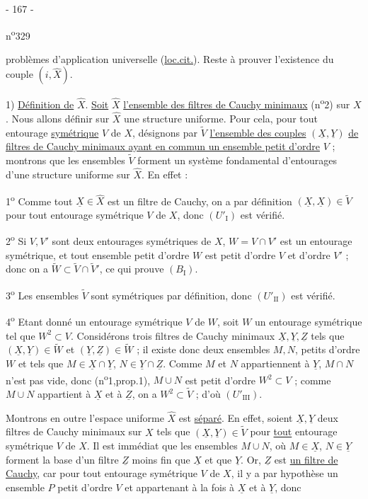 \begin{center}- 167 -\end{center}
\hfill n\textsuperscript{o}329

problèmes d'application universelle (\uline{loc.cit.}). Reste à prouver l'existence
du couple $(i,\widehat{X})$.

1) \uline{Définition de} $\widehat{X}$. \uline{Soit} $\widehat{X}$
\uline{l'ensemble des filtres de Cauchy minimaux} (n\textsuperscript{o}2)
sur $X$. Nous allons définir sur $\widehat{X}$ une structure uniforme.
Pour cela, pour tout entourage \uline{symétrique} $V$ de $X$, désignons par
$\widetilde{V}$ \uline{l'ensemble des couples}
$(\underline{X},\underline{Y})$ \uline{de filtres de Cauchy minimaux ayant en commun
un ensemble petit d'ordre} $V$ ; montrons que les ensembles $\widetilde{V}$
forment un système fondamental d'entourages d'une structure uniforme sur
$\widehat{X}$. En effet :

1\textsuperscript{o} Comme tout $\underline{X}\in\widehat{X}$ est un filtre de
Cauchy, on a par définition $(\underline{X},\underline{X})\in\widetilde{V}$
pour tout entourage symétrique $V$ de $X$, donc $(U'_{\mathrm{I}})$ est vérifié.

2\textsuperscript{o} Si $V,V'$ sont deux entourages symétriques de $X$,
$W=V\cap V'$ est un entourage symétrique, et tout ensemble petit d'ordre $W$
est petit d'ordre $V$ et d'ordre $V'$ ; donc on a
$\widetilde{W}\subset\widetilde{V}\cap\widetilde{V}'$, ce qui prouve $(B_{\mathrm{I}})$.

3\textsuperscript{o} Les ensembles $\widetilde{V}$ sont symétriques par définition,
donc $(U'_{\mathrm{II}})$ est vérifié.

4\textsuperscript{o} Etant donné un entourage symétrique $V$ de $W$, soit $W$ un
entourage symétrique tel que $W^2\subset V$. Considérons trois filtres de Cauchy
minimaux $\underline{X},\underline{Y},\underline{Z}$ tels que
$(\underline{X},\underline{Y})\in\widetilde{W}$ et
$(\underline{Y},\underline{Z})\in\widetilde{W}$ ; il existe donc deux ensembles
$M,N$, petits d'ordre $W$ et tels que $M\in\underline{X}\cap\underline{Y}$,
$N\in\underline{Y}\cap\underline{Z}$. Comme $M$ et $N$ appartiennent à
$\underline{Y}$, $M\cap N$ n'est pas vide, donc (n\textsuperscript{o}1,prop.1),
$M\cup N$ est petit d'ordre $W^2\subset V$ ; comme $M\cup N$ appartient à
$\underline{X}$ et à $\underline{Z}$, on a $W^2\subset\widetilde{V}$ ;
d'où $(U'_{\mathrm{III}})$.

Montrons en outre l'espace uniforme $\widehat{X}$ est \uline{séparé}.
En effet, soient $\underline{X},\underline{Y}$ deux filtres de Cauchy minimaux
sur $X$ tels que $(\underline{X},\underline{Y})\in\widetilde{V}$ pour
\uline{tout} entourage symétrique $V$ de $X$. Il est immédiat que les ensembles
$M\cup N$, où $M\in\underline{X}$, $N\in\underline{Y}$ forment la base d'un
filtre $\underline{Z}$ moins fin que $\underline{X}$ et que $\underline{Y}$.
Or, $\underline{Z}$ est \uline{un filtre de Cauchy}, car pour tout entourage
symétrique $V$ de $X$, il y a par hypothèse un ensemble $P$ petit d'ordre $V$
et appartenant à la fois à $\underline{X}$ et à $\underline{Y}$, donc
